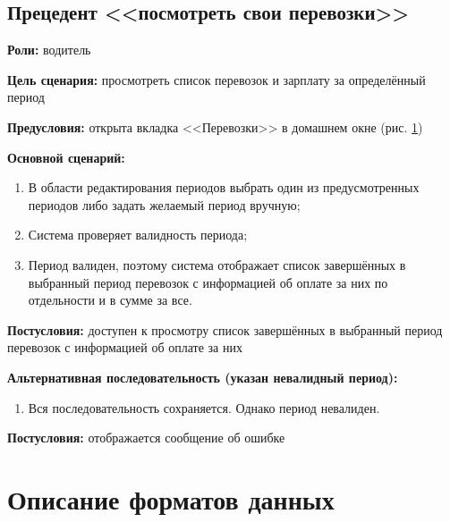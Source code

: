 \subsection{Прецедент <<посмотреть свои перевозки>>}
\textbf{Роли:} водитель \par
\textbf{Цель сценария:} просмотреть список перевозок и 
    зарплату за определённый период \par
\textbf{Предусловия:} открыта вкладка <<Перевозки>> 
    в домашнем окне (рис. \ref{}) \par
\textbf{Основной сценарий:} 
\begin{enumerate}
    \item В области редактирования периодов выбрать 
        один из предусмотренных периодов либо задать желаемый период вручную;
    \item Система проверяет валидность периода;
    \item Период валиден, поэтому система отображает список 
        завершённых в выбранный период перевозок с информацией 
        об оплате за них по отдельности и в сумме за все.
\end{enumerate} \par
\textbf{Постусловия:} доступен к просмотру список завершённых 
    в выбранный период перевозок с информацией об оплате за них \par
\textbf{Альтернативная последовательность (указан невалидный период):} \par
\begin{enumerate}
    \item Вся последовательность сохраняется. Однако период невалиден.
\end{enumerate} \par
\textbf{Постусловия:} отображается сообщение об ошибке \par


\section{Описание форматов данных}

